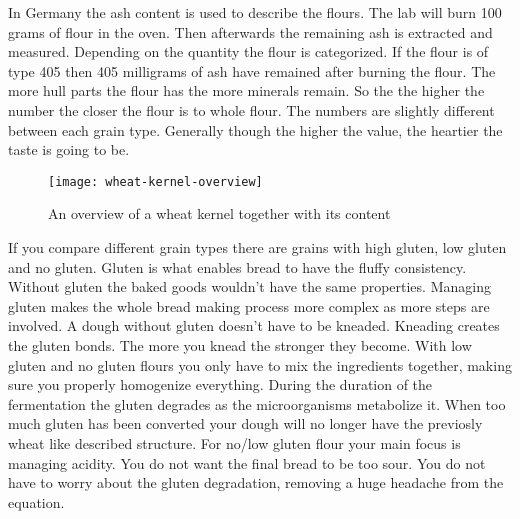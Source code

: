 In Germany the ash content is used to describe the flours. The lab will burn
100 grams of flour in the oven. Then afterwards the remaining ash is extracted
and measured. Depending on the quantity the flour is categorized. If the flour
is of type 405 then 405 milligrams of ash have remained after burning the
flour. The more hull parts the flour has the more minerals remain. So the the
higher the number the closer the flour is to whole flour. The numbers are
slightly different between each grain type. Generally though the higher the
value, the heartier the taste is going to be.

\begin{figure}[htb!]
  \texttt{[image: wheat-kernel-overview]}
  \caption{An overview of a wheat kernel together with its content}
  \label{fig:wheat-kernel-overview}
\end{figure}

If you compare different grain types there are grains with high gluten, low gluten
and no gluten. Gluten is what enables bread to have the fluffy consistency.
Without gluten the baked goods wouldn't have the same properties. Managing
gluten makes the whole bread making process more complex as more steps are involved.
A dough without gluten doesn't have to be kneaded. Kneading creates
the gluten bonds. The more you knead the stronger they become. With low
gluten and no gluten flours you only have to mix the ingredients together, making
sure you properly homogenize everything. During the duration of the fermentation
the gluten degrades as the microorganisms metabolize it. When too much gluten
has been converted your dough will no longer have the previosly wheat like described
structure. For no/low gluten flour your main focus is managing acidity. You do not
want the final bread to be too sour. You do not have to worry about the gluten
degradation, removing a huge headache from the equation.


